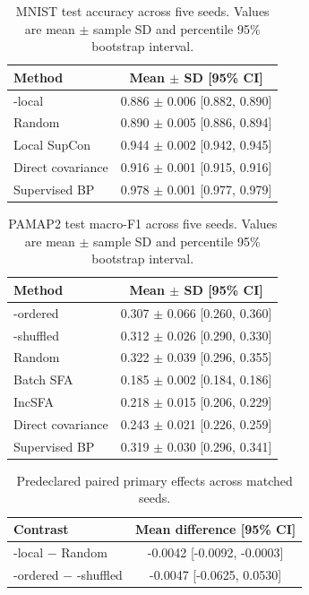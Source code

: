 \begin{table}[H]
\centering
\caption{MNIST test accuracy across five seeds. Values are mean $\pm$ sample SD and percentile 95\% bootstrap interval.}
\label{tab:mnist-confirmatory}
\begin{tabular}{lc}
\toprule
Method & Mean $\pm$ SD [95\% CI] \\
\midrule
\TeReL{}-local & 0.886 $\pm$ 0.006 [0.882, 0.890] \\
Random & 0.890 $\pm$ 0.005 [0.886, 0.894] \\
Local SupCon & 0.944 $\pm$ 0.002 [0.942, 0.945] \\
Direct covariance & 0.916 $\pm$ 0.001 [0.915, 0.916] \\
Supervised BP & 0.978 $\pm$ 0.001 [0.977, 0.979] \\
\bottomrule
\end{tabular}
\end{table}

\begin{table}[H]
\centering
\caption{PAMAP2 test macro-F1 across five seeds. Values are mean $\pm$ sample SD and percentile 95\% bootstrap interval.}
\label{tab:pamap2-confirmatory}
\begin{tabular}{lc}
\toprule
Method & Mean $\pm$ SD [95\% CI] \\
\midrule
\TeReL{}-ordered & 0.307 $\pm$ 0.066 [0.260, 0.360] \\
\TeReL{}-shuffled & 0.312 $\pm$ 0.026 [0.290, 0.330] \\
Random & 0.322 $\pm$ 0.039 [0.296, 0.355] \\
Batch SFA & 0.185 $\pm$ 0.002 [0.184, 0.186] \\
IncSFA & 0.218 $\pm$ 0.015 [0.206, 0.229] \\
Direct covariance & 0.243 $\pm$ 0.021 [0.226, 0.259] \\
Supervised BP & 0.319 $\pm$ 0.030 [0.296, 0.341] \\
\bottomrule
\end{tabular}
\end{table}

\begin{table}[H]
\centering
\caption{Predeclared paired primary effects across matched seeds.}
\label{tab:primary-contrasts}
\begin{tabular}{lc}
\toprule
Contrast & Mean difference [95\% CI] \\
\midrule
\TeReL{}-local $-$ Random & -0.0042 [-0.0092, -0.0003] \\
\TeReL{}-ordered $-$ \TeReL{}-shuffled & -0.0047 [-0.0625, 0.0530] \\
\bottomrule
\end{tabular}
\end{table}

